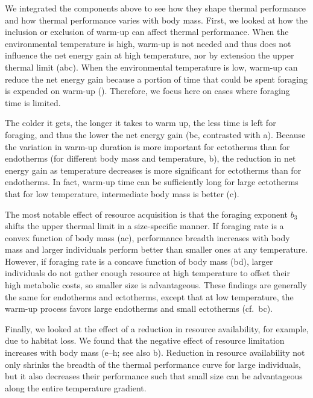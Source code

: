 We integrated the components above to see how they shape thermal performance and how thermal performance varies with body mass.
First, we looked at how the inclusion or exclusion of warm-up can affect thermal performance.
When the environmental temperature is high, warm-up is not needed and thus does not influence the net energy gain at high temperature, nor by extension the upper thermal limit (abc).
When the environmental temperature is low, warm-up can reduce the net energy gain because a portion of time that could be spent foraging is expended on warm-up ().
Therefore, we focus here on cases where foraging time is limited.

The colder it gets, the longer it takes to warm up, the less time is left for foraging, and thus the lower the net energy gain (bc, contrasted with a).
Because the variation in warm-up duration is more important for ectotherms than for endotherms (for different body mass and temperature, b), the reduction in net energy gain as temperature decreases is more significant for ectotherms than for endotherms.
In fact, warm-up time can be sufficiently long for large ectotherms that for low temperature, intermediate body mass is better (c).


The most notable effect of resource acquisition is that the foraging exponent $b_3$ shifts the upper thermal limit in a size-specific manner.
If foraging rate is a convex function of body mass (ac), performance breadth increases with body mass and larger individuals perform better than smaller ones at any temperature.
However, if foraging rate is a concave function of body mass (bd), larger individuals do not gather enough resource at high temperature to offset their high metabolic costs, so smaller size is advantageous.
These findings are generally the same for endotherms and ectotherms, except that at low temperature, the warm-up process favors large endotherms and small ectotherms (cf.~bc).

Finally, we looked at the effect of a reduction in resource availability, for example, due to habitat loss.
We found that the negative effect of resource limitation increases with body mass (e--h; see also b).
Reduction in resource availability not only shrinks the breadth of the thermal performance curve for large individuals, but it also decreases their performance such that small size can be advantageous along the entire temperature gradient.

